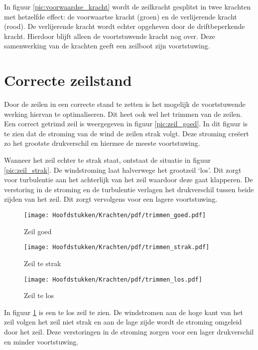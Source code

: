 In figuur \ref{pic:voorwaardse_kracht} wordt de zeilkracht gesplitst in twee krachten met hetzelfde effect: de voorwaartse kracht (groen) en de verlijerende kracht (rood). De verlijerende kracht wordt echter opgeheven door de driftbeperkende kracht. Hierdoor blijft alleen de voortstuwende kracht nog over. Deze samenwerking van de krachten geeft een zeilboot zijn voortstuwing.

\section{Correcte zeilstand}
Door de zeilen in een correcte stand te zetten is het mogelijk de voortstuwende werking hiervan te optimaliseren. Dit heet ook wel het trimmen van de zeilen. Een correct getrimd zeil is weergegeven in figuur \ref{pic:zeil_goed}. In dit figuur is te zien dat de stroming van de wind de zeilen strak volgt. Deze stroming creëert zo het grootste drukverschil en hiermee de meeste voortstuwing. 

Wanneer het zeil echter te strak staat, ontstaat de situatie in figuur \ref{pic:zeil_strak}. De windstroming laat halverwege het grootzeil `los'. Dit zorgt voor turbulentie aan het achterlijk van het zeil waardoor deze gaat klapperen. De verstoring in de stroming en de turbulentie verlagen het drukverschil tussen beide zijden van het zeil. Dit zorgt vervolgens voor een lagere voortstuwing.

\begin{figure}[H]
  \centering
  \begin{minipage}[b]{0.32\textwidth}
  \centering
    \texttt{[image: Hoofdstukken/Krachten/pdf/trimmen\_goed.pdf]}
    \caption{Zeil goed}
    \label{pic:zeil_goed}
  \end{minipage}
  \hfill
  \begin{minipage}[b]{0.32\textwidth}
    \centering
    \texttt{[image: Hoofdstukken/Krachten/pdf/trimmen\_strak.pdf]}
    \caption{Zeil te strak}
    \label{pic:zeil_strak}
    \end{minipage}
  \hfill
  \begin{minipage}[b]{0.32\textwidth}
    \centering
    \texttt{[image: Hoofdstukken/Krachten/pdf/trimmen\_los.pdf]}
    \caption{Zeil te los}
    \label{pic:zeil_los}
  \end{minipage}
\end{figure}

In figuur \ref{pic:zeil_los} is een te los zeil te zien. De windstromen aan de hoge kant van het zeil volgen het zeil niet strak en aan de lage zijde wordt de stroming omgeleid door het zeil. Deze verstoringen in de stroming zorgen voor een lager drukverschil en minder voortstuwing. 

